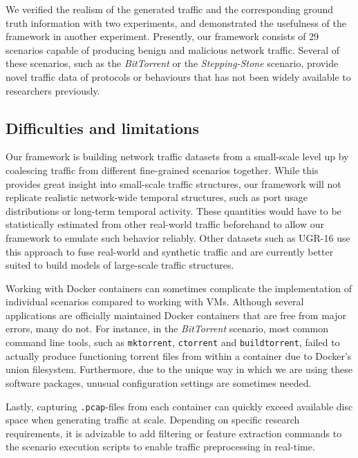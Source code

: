 \documentclass[sigconf]{acmart}
\begin{document}
We verified the realism of the generated traffic and the corresponding ground truth information with two experiments, and demonstrated the usefulness of the framework in another experiment.
Presently, our framework consists of 29 scenarios capable of producing benign and malicious network traffic. Several of these scenarios, such as the \emph{BitTorrent} or the \emph{Stepping-Stone} scenario, provide novel traffic data of protocols or behaviours that has not been widely available to researchers previously.


\subsection{Difficulties and limitations}

Our framework is building network traffic datasets from a small-scale level up by coalescing traffic from different fine-grained scenarios together. While this provides great insight into small-scale traffic structures, our framework will not replicate realistic network-wide temporal structures, such as port usage distributions or long-term temporal activity. These quantities would have to be statistically estimated from other real-world traffic beforehand to allow our framework to emulate such behavior reliably. Other datasets such as UGR-16 use this approach to fuse real-world and synthetic traffic and are currently better suited to build models of large-scale traffic structures.

Working with Docker containers can sometimes complicate the implementation of individual scenarios compared to working with VMs. Although several applications are officially maintained Docker containers that are free from major errors, many do not. For instance, in the \textit{BitTorrent} scenario, most common command line tools, such as \texttt{mktorrent}, \texttt{ctorrent} and \texttt{buildtorrent}, failed to actually produce functioning torrent files from within a container due to Docker's union filesystem. Furthermore, due to the unique way in which we are using these software packages, unusual configuration settings are sometimes needed. %

Lastly, capturing \texttt{.pcap}-files from each container can quickly exceed available disc space when generating traffic at scale. Depending on specific research requirements, it is advizable to add filtering or feature extraction commands to the scenario execution scripts to enable traffic preprocessing in real-time.
\end{document}
